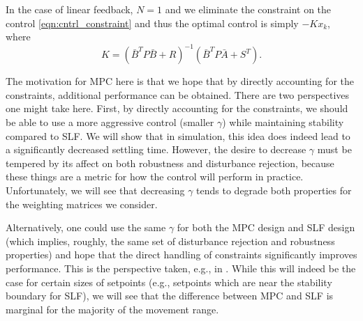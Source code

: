 \documentclass[journal,twocolumn,twoside]{IEEEtran}
\newcommand{\Ad}{\ensuremath{\bar A }\xspace}
\newcommand{\Bd}{\ensuremath{\bar B }\xspace}
\begin{document}
In the case of linear feedback, $N=1$ and we eliminate the constraint on the control \eqref{eqn:cntrl_constraint} and thus the optimal control is simply $-Kx_k$, where
\begin{equation}
  K = (\Bd^TP\Bd + R)^{-1}(\Bd^TP\Ad + S^T).
\end{equation}

The motivation for MPC here is that we hope that by directly accounting for the constraints, additional performance can be obtained. There are two perspectives one might take here. First, by directly accounting for the constraints, we should be able to use a more aggressive control (smaller $\gamma$) while maintaining stability compared to SLF.
We will show that in simulation, this idea does indeed lead to a significantly decreased settling time. However, the desire to decrease $\gamma$ must be tempered by its affect on both robustness and disturbance rejection, because these things are a metric for how the control will perform in practice. Unfortunately, we will see that decreasing $\gamma$ tends to degrade both properties for the weighting matrices we consider. 

Alternatively, one could use the same $\gamma$ for both the MPC design and SLF design (which implies, roughly,  the same set of disturbance rejection and robustness properties) and hope that the direct handling of constraints significantly improves performance. This is the perspective taken, e.g., in \cite{Wills_CDC_2005}. While this will indeed be the case for certain sizes of setpoints (e.g., setpoints which are near the stability boundary for SLF), we will see that the difference between MPC and SLF is marginal for the majority of the movement range.

\end{document}
